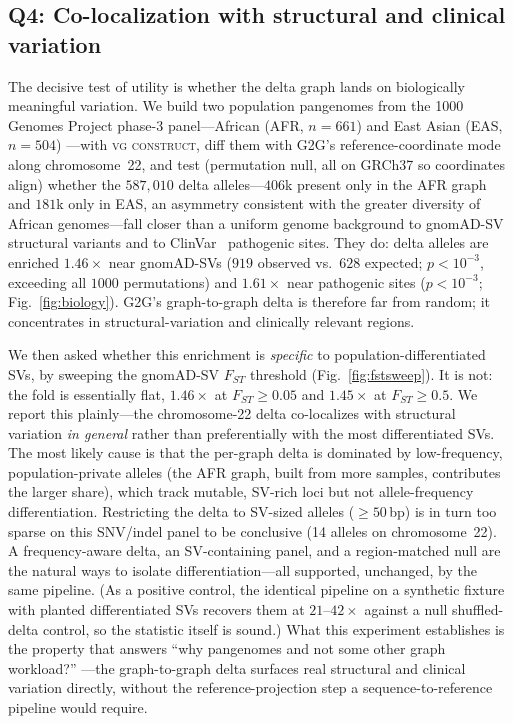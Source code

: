 \documentclass[conference]{IEEEtran}
\theoremstyle{plain}
\theoremstyle{definition}
\begin{document}
\subsection{Q4: Co-localization with structural and clinical variation}
The decisive test of utility is whether the delta graph lands on biologically
meaningful variation. We build two population pangenomes from the 1000 Genomes
Project phase-3 panel---African (AFR, $n{=}661$) and East Asian (EAS, $n{=}504$)
---with \textsc{vg construct}, diff them with \textsc{G2G}'s reference-coordinate
mode along chromosome~22, and test (permutation null, all on GRCh37 so coordinates
align) whether the $587{,}010$ delta alleles---$406$k present only in the AFR
graph and $181$k only in EAS, an asymmetry consistent with the greater diversity
of African genomes---fall closer than a uniform genome background to
gnomAD-SV~\cite{collins2017svfst} structural variants and to
ClinVar~\cite{landrum2018clinvar} pathogenic sites. They do: delta alleles are
enriched $1.46\times$ near gnomAD-SVs ($919$ observed vs.\ $628$ expected;
$p<10^{-3}$, exceeding all $1000$ permutations) and $1.61\times$ near pathogenic
sites ($p<10^{-3}$; Fig.~\ref{fig:biology}). \textsc{G2G}'s graph-to-graph delta is therefore far from
random; it concentrates in structural-variation and clinically relevant regions.

We then asked whether this enrichment is \emph{specific} to
population-differentiated SVs, by sweeping the gnomAD-SV $F_{ST}$ threshold
(Fig.~\ref{fig:fstsweep}). It is not: the fold is essentially flat, $1.46\times$
at $F_{ST}{\geq}0.05$ and $1.45\times$ at $F_{ST}{\geq}0.5$. We report this
plainly---the chromosome-22 delta co-localizes with structural variation
\emph{in general} rather than preferentially with the most differentiated SVs.
The most likely cause is that the per-graph delta is dominated by low-frequency,
population-private alleles (the AFR graph, built from more samples, contributes
the larger share), which track mutable, SV-rich loci but not allele-frequency
differentiation. Restricting the delta to SV-sized alleles ($\geq 50$\,bp) is in
turn too sparse on this SNV/indel panel to be conclusive (14 alleles on
chromosome~22). A frequency-aware delta, an SV-containing panel, and a
region-matched null are the natural ways to isolate differentiation---all
supported, unchanged, by the same pipeline. (As a
positive control, the identical pipeline on a synthetic fixture with planted
differentiated SVs recovers them at $21$--$42\times$ against a null shuffled-delta
control, so the statistic itself is sound.) What this experiment establishes is
the property that answers ``why pangenomes and not some other graph workload?''
---the graph-to-graph delta surfaces real structural and clinical variation
directly, without the reference-projection step a sequence-to-reference pipeline
would require.
\end{document}
